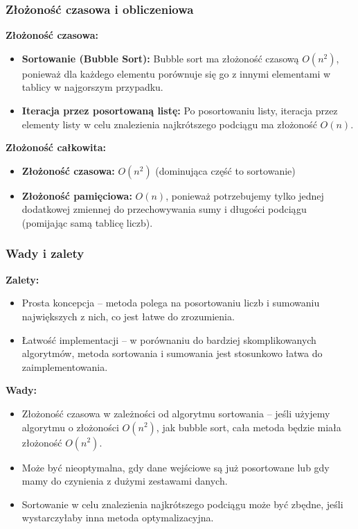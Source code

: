 \documentclass[12pt,twoside]{article}
\begin{document}
\subsubsection{Złożoność czasowa i obliczeniowa}
\textbf{Złożoność czasowa:}
\begin{itemize}
    \item \textbf{Sortowanie (Bubble Sort):} Bubble sort ma złożoność czasową $O(n^2)$, ponieważ dla każdego elementu porównuje się go z innymi elementami w tablicy w najgorszym przypadku.
    \item \textbf{Iteracja przez posortowaną listę:} Po posortowaniu listy, iteracja przez elementy listy w celu znalezienia najkrótszego podciągu ma złożoność $O(n)$.
\end{itemize}
\textbf{Złożoność całkowita:}
\begin{itemize}
    \item \textbf{Złożoność czasowa:} $O(n^2)$ (dominująca część to sortowanie)
    \item \textbf{Złożoność pamięciowa:} $O(n)$, ponieważ potrzebujemy tylko jednej dodatkowej zmiennej do przechowywania sumy i długości podciągu (pomijając samą tablicę liczb).
\end{itemize}
\subsubsection{Wady i zalety}

\textbf{Zalety:}
\begin{itemize}
    \item Prosta koncepcja – metoda polega na posortowaniu liczb i sumowaniu największych z nich, co jest łatwe do zrozumienia.
    \item Łatwość implementacji – w porównaniu do bardziej skomplikowanych algorytmów, metoda sortowania i sumowania jest stosunkowo łatwa do zaimplementowania.
\end{itemize}
\textbf{Wady:}
\begin{itemize}
    \item Złożoność czasowa w zależności od algorytmu sortowania – jeśli użyjemy algorytmu o złożoności $O(n^2)$, jak bubble sort, cała metoda będzie miała złożoność $O(n^2)$.
    \item Może być nieoptymalna, gdy dane wejściowe są już posortowane lub gdy mamy do czynienia z dużymi zestawami danych.
    \item Sortowanie w celu znalezienia najkrótszego podciągu może być zbędne, jeśli wystarczyłaby inna metoda optymalizacyjna.
\end{itemize}
\end{document}
